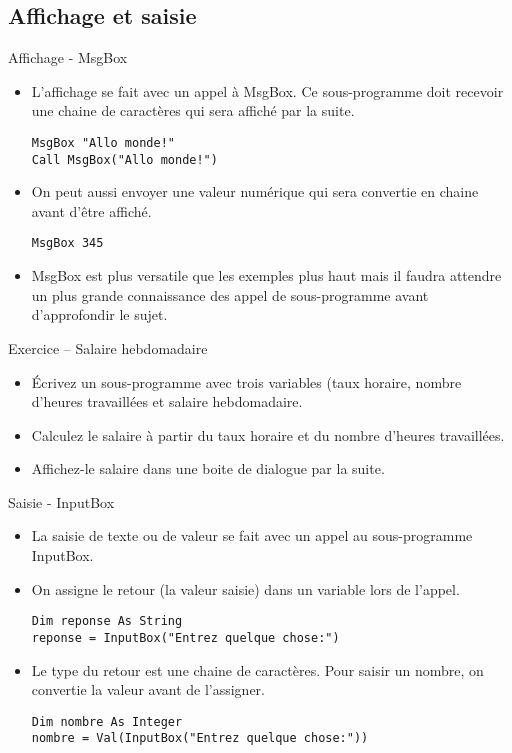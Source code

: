 \documentclass[aspectratio=169,usenames,dvipsnames]{beamer}
\begin{document}
    \subsection{Affichage et saisie}
    \begin{frame}[fragile]{Affichage - MsgBox}
        \begin{itemize}
            \item L’affichage se fait avec un appel à MsgBox. Ce sous-programme doit recevoir une chaine de caractères qui sera affiché par la suite.
            \begin{lstlisting}
MsgBox "Allo monde!"
Call MsgBox("Allo monde!")
            \end{lstlisting}
            \item On peut aussi envoyer une valeur numérique qui sera convertie en chaine avant d’être affiché.
            \begin{lstlisting}
MsgBox 345
            \end{lstlisting}
            \item MsgBox est plus versatile que les exemples plus haut mais il faudra attendre un plus grande connaissance des appel de sous-programme avant d’approfondir le sujet.

        \end{itemize}
    \end{frame}
    \begin{frame}{Exercice – Salaire hebdomadaire}
        \begin{itemize}
            \item Écrivez un sous-programme avec trois variables (taux horaire, nombre d’heures travaillées et salaire hebdomadaire.
            \item Calculez le salaire à partir du taux horaire et du nombre d’heures travaillées. 
            \item Affichez-le salaire dans une boite de dialogue par la suite.
        \end{itemize}
    \end{frame}
    \begin{frame}[fragile]{Saisie - InputBox}
        \begin{itemize}
            \item La saisie de texte ou de valeur se fait avec un appel au sous-programme InputBox.
            \item On assigne le retour (la valeur saisie) dans un variable lors de l’appel.
            \begin{lstlisting}
Dim reponse As String
reponse = InputBox("Entrez quelque chose:")
            \end{lstlisting}
            \item Le type du retour est une chaine de caractères. Pour saisir un nombre, on convertie la valeur avant de l’assigner.
            \begin{lstlisting}
Dim nombre As Integer
nombre = Val(InputBox("Entrez quelque chose:"))
            \end{lstlisting}
        \end{itemize}
    \end{frame}
\end{document}
